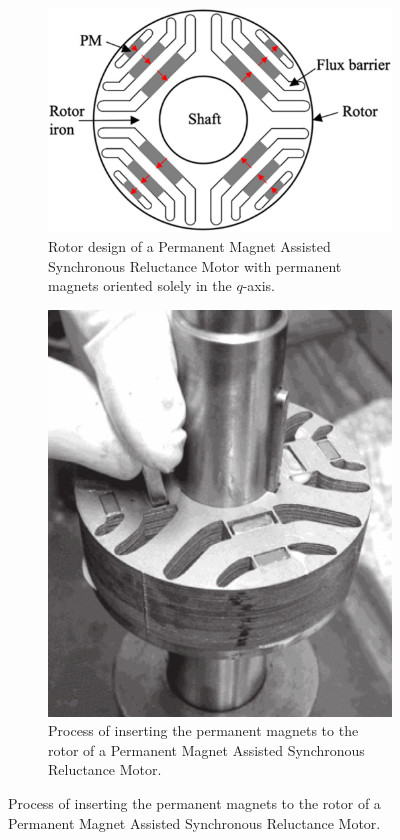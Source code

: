 \documentclass[a4paper, twoside, 11pt]{article}
\begin{document}
\begin{figure}[H]
    \begin{subfigure}{0.4\textwidth}
            \centering
            \includegraphics[width=1\textwidth]{src/png/pmsynrelm-rotor-magnets-q-axis.png}
            \caption{Rotor design of a Permanent Magnet Assisted Synchronous Reluctance Motor with permanent magnets oriented solely in the $q$-axis. \cite{tavernini-design-and-optimisation-of-energy-efficient-pmsynrelm-for-electric-vehicles}}
            \label{fig:pmsynrelm-rotor-magnets-q-axis}
    \end{subfigure}
\hfill
    \begin{subfigure}{0.4\textwidth}
            \centering
            \includegraphics[width=1\textwidth]{src/png/pm-inserted.png}
            \caption{Process of inserting the permanent magnets to the rotor of a Permanent Magnet Assisted Synchronous Reluctance Motor. \cite{wang-synchronous-motors-for-traction-applications}}
            \label{fig:pm-inserted}
    \end{subfigure}


\end{figure}
\end{document}
